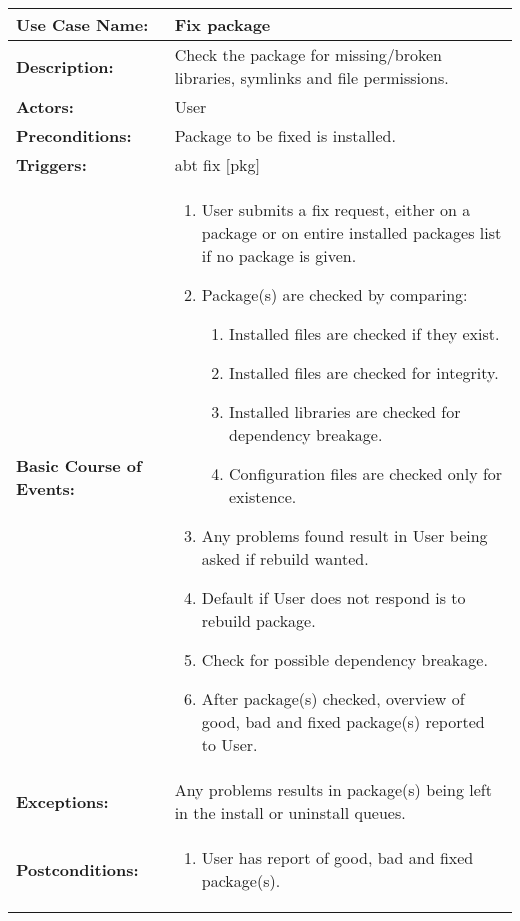 
\begin{tabularx}{\linewidth}{|l|X|}
\hline
\textbf{Use Case Name:} & \textbf{Fix package} \\
\hline
\textbf{Description:} & 
Check the package for missing/broken libraries, symlinks and file permissions.
\\
\hline
\textbf{Actors:} & User \\
\hline
\textbf{Preconditions:} & Package to be fixed is installed. \\
\hline
\textbf{Triggers:} & abt fix $[$pkg$]$ \\
\hline
\textbf{Basic Course of Events:} & 
\begin{minipage}{\linewidth} 
  \vspace{0.05em}
  \begin{enumerate}
    \item User submits a fix request, either on a package or on entire installed packages list if no package is given.
    \item Package(s) are checked by comparing:
    \begin{enumerate}
      \item Installed files are checked if they exist.
      \item Installed files are checked for integrity.
      \item Installed libraries are checked for dependency breakage.
      \item Configuration files are checked only for existence.
    \end{enumerate}
    \item Any problems found result in User being asked if rebuild wanted.
    \item Default if User does not respond is to rebuild package.
    \item Check for possible dependency breakage.
    \item After package(s) checked, overview of good, bad and fixed package(s) reported to User.
  \end{enumerate}
  \vspace{0.05em}
\end{minipage}
\\
\hline 
\textbf{Exceptions:} & 
Any problems results in package(s) being left in the install or uninstall queues. 
\\
\hline 
\textbf{Postconditions:} &
\begin{minipage}{\linewidth}
  \vspace{0.05em}
  \begin{enumerate}
    \item User has report of good, bad and fixed package(s).
  \end{enumerate}
  \vspace{0.05em}
\end{minipage}
\\
\hline
\end{tabularx}


